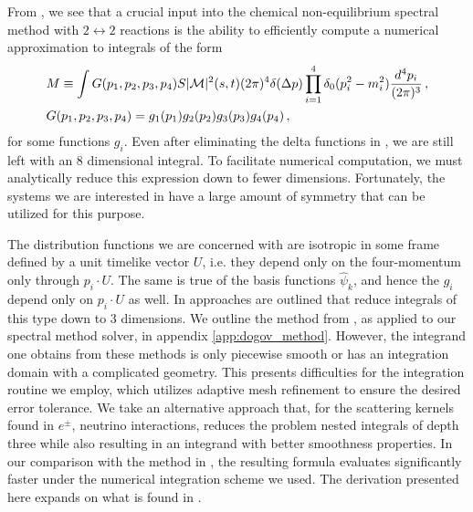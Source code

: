 From , we see that a crucial input into the chemical non-equilibrium spectral method with $2 \leftrightarrow 2$ reactions is the ability to efficiently compute a numerical approximation to integrals of the form
\begin{align}\label{coll_ip}
&M\equiv\int G(p_1,p_2,p_3,p_4) S |\mathcal{M}|^2(s,t) (2\pi)^4\delta(\Delta p)\prod_{i=1}^4 \delta_0(p_i^2-m_i^2)\frac{d^4p_i}{(2\pi)^3}\,,\\
&G(p_1,p_2,p_3,p_4)=g_1(p_1)g_2(p_2)g_3(p_3)g_4(p_4)\,,\notag
\end{align}
for some functions $g_i$. Even after eliminating the delta functions in , we are still left with an $8$ dimensional integral.  To facilitate numerical computation, we must analytically reduce this expression down to fewer dimensions.  Fortunately, the systems we are interested in have a large amount of symmetry that  can be utilized for this purpose.  

The distribution functions we are concerned with are isotropic in some frame defined  by a unit timelike vector $U$, i.e. they depend only on the four-momentum only through $p_i\cdot U$.  The same is true of the basis functions $\hat\psi_k$, and hence the  $g_i$ depend only on $p_i\cdot U$ as well.  In \cite{Hannestad:1995rs,Dolgov:1997mb,Dolgov:1998sf} approaches are outlined that reduce integrals of this type down to $3$ dimensions.  We outline the method from \cite{Dolgov:1997mb,Dolgov:1998sf}, as applied to our spectral method solver, in appendix \ref{app:dogov_method}.  However, the integrand one obtains from these methods is only piecewise smooth or has an integration domain with a complicated geometry.  This presents difficulties for the integration routine we employ, which utilizes adaptive mesh refinement to ensure the desired error tolerance.  We take an alternative approach that, for the scattering kernels found in $e^\pm$, neutrino interactions, reduces the problem nested integrals  of depth three while also resulting in an integrand with better smoothness properties.  In our comparison with the method in \cite{Dolgov:1997mb,Dolgov:1998sf}, the resulting formula evaluates significantly faster under the numerical integration scheme we used.   The derivation presented here expands on what is found in \cite{Letessier:2002ony}.

